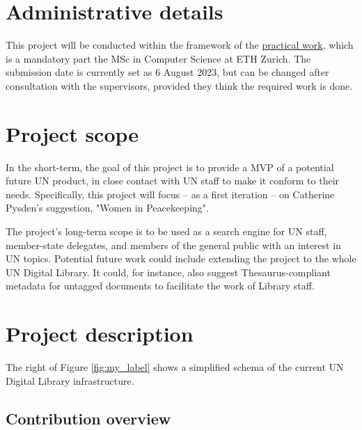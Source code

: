\documentclass[11pt]{article}
\begin{document}
\section{Administrative details} \label{admin}

This project will be conducted within the framework of the \href{https://ethz.ch/content/dam/ethz/special-interest/infk/department/Images%20and%20Content/Studies/Forms%20and%20Documents/Memo_Practical%20Work.pdf}{practical work}, which is a mandatory part the MSc in Computer Science at ETH Zurich.
The submission date is currently set as 6 August 2023, but can be changed after consultation with the supervisors, provided they think the required work is done.

\section{Project scope}

In the short-term, the goal of this project is to provide a MVP of a potential future UN product, in close contact with UN staff to make it conform to their needs. Specifically, this project will focus – as a first iteration – on Catherine Pysden's suggestion, "Women in Peacekeeping".

The project's long-term scope is to be used as a search engine for UN staff, member-state delegates, and members of the general public with an interest in UN topics. Potential future work could include extending the project to the whole UN Digital Library. It could, for instance, also suggest Thesaurus-compliant metadata for untagged documents to facilitate the work of Library staff.


\section{Project description} \label{desc}


The right of Figure \ref{fig:my_label} shows a simplified schema of the current UN Digital Library infrastructure. 

\subsection{Contribution overview}
\end{document}
